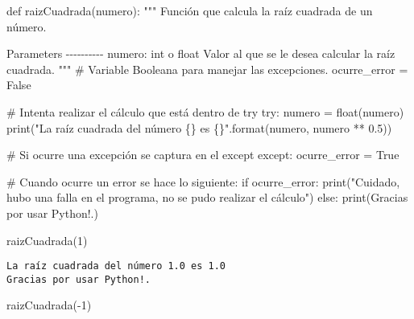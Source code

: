 \documentclass[
  letterpaper,
  DIV=11,
  numbers=noendperiod]{scrreprt}
\newenvironment{Shaded}{\begin{snugshade}}{\end{snugshade}}
\newcommand{\BuiltInTok}[1]{\textcolor[rgb]{0.00,0.23,0.31}{#1}}
\newcommand{\CommentTok}[1]{\textcolor[rgb]{0.37,0.37,0.37}{#1}}
\newcommand{\ControlFlowTok}[1]{\textcolor[rgb]{0.00,0.23,0.31}{#1}}
\newcommand{\DecValTok}[1]{\textcolor[rgb]{0.68,0.00,0.00}{#1}}
\newcommand{\FloatTok}[1]{\textcolor[rgb]{0.68,0.00,0.00}{#1}}
\newcommand{\KeywordTok}[1]{\textcolor[rgb]{0.00,0.23,0.31}{#1}}
\newcommand{\NormalTok}[1]{\textcolor[rgb]{0.00,0.23,0.31}{#1}}
\newcommand{\OperatorTok}[1]{\textcolor[rgb]{0.37,0.37,0.37}{#1}}
\newcommand{\SpecialCharTok}[1]{\textcolor[rgb]{0.37,0.37,0.37}{#1}}
\newcommand{\StringTok}[1]{\textcolor[rgb]{0.13,0.47,0.30}{#1}}
\newcommand{\VariableTok}[1]{\textcolor[rgb]{0.07,0.07,0.07}{#1}}
\begin{document}
\begin{Shaded}
\begin{Highlighting}[]
\KeywordTok{def}\NormalTok{ raizCuadrada(numero):}
    \CommentTok{"""}
\CommentTok{    Función que calcula la raíz cuadrada de un número.}

\CommentTok{    Parameters}
\CommentTok{    {-}{-}{-}{-}{-}{-}{-}{-}{-}{-}}
\CommentTok{    numero: int o float}
\CommentTok{    Valor al que se le desea calcular la raíz cuadrada.}
\CommentTok{    }
\CommentTok{    """}
    \CommentTok{\# Variable Booleana para manejar las excepciones.}
\NormalTok{    ocurre\_error }\OperatorTok{=} \VariableTok{False}
    
    \CommentTok{\# Intenta realizar el cálculo que está dentro de try    }
    \ControlFlowTok{try}\NormalTok{:}
\NormalTok{        numero }\OperatorTok{=} \BuiltInTok{float}\NormalTok{(numero)}
        \BuiltInTok{print}\NormalTok{(}\StringTok{"La raíz cuadrada del número }\SpecialCharTok{\{\}}\StringTok{ es }\SpecialCharTok{\{\}}\StringTok{"}\NormalTok{.}\BuiltInTok{format}\NormalTok{(numero, numero }\OperatorTok{**} \FloatTok{0.5}\NormalTok{))}

    \CommentTok{\# Si ocurre una excepción se captura en el except}
    \ControlFlowTok{except}\NormalTok{:}
\NormalTok{        ocurre\_error }\OperatorTok{=} \VariableTok{True}

    \CommentTok{\# Cuando ocurre un error se hace lo siguiente:}
    \ControlFlowTok{if}\NormalTok{ ocurre\_error:}
        \BuiltInTok{print}\NormalTok{(}\StringTok{"Cuidado, hubo una falla en el programa, no se pudo realizar el cálculo"}\NormalTok{)}
    \ControlFlowTok{else}\NormalTok{:}
        \BuiltInTok{print}\NormalTok{(}\StringTok{\textquotesingle{}Gracias por usar Python!.\textquotesingle{}}\NormalTok{)}
\end{Highlighting}
\end{Shaded}

\begin{Shaded}
\begin{Highlighting}[]
\NormalTok{raizCuadrada(}\DecValTok{1}\NormalTok{)}
\end{Highlighting}
\end{Shaded}

\begin{verbatim}
La raíz cuadrada del número 1.0 es 1.0
Gracias por usar Python!.
\end{verbatim}

\begin{Shaded}
\begin{Highlighting}[]
\NormalTok{raizCuadrada(}\OperatorTok{{-}}\DecValTok{1}\NormalTok{)}
\end{Highlighting}
\end{Shaded}
\end{document}
